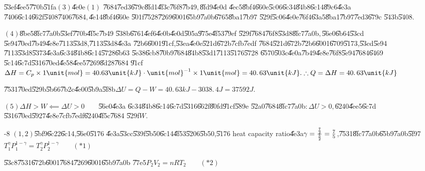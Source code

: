 \documentclass{article}
\begin{document}
\U{53ef}\U{4ee5}\U{770b}\U{51fa}$\left( 3\right) $\U{4e0e}$\left( 1\right) $%
\U{7684}\U{7ed3}\U{679c}\U{8fd1}\U{4f3c}\U{76f8}\U{7b49}$,$\U{8fd9}\U{4e0d}%
\U{4ec5}\U{8bf4}\U{660e}\U{5c06}\U{6c34}\U{84b8}\U{6c14}\U{89c6}\U{4e3a}%
\U{7406}\U{6c14}\U{662f}\U{5408}\U{7406}\U{7684}$,$\U{4e14}\U{8bf4}\U{660e}%
\U{501f}\U{7528}\U{7269}\U{6001}\U{65b9}\U{7a0b}\U{6765}\U{8ba1}\U{7b97}%
\U{529f}\U{5c06}\U{4e0e}\U{76f4}\U{63a5}\U{8ba1}\U{7b97}\U{7ed3}\U{679c}%
\U{543b}\U{5408}$.$

$\left( 4\right) $\U{8be5}\U{8fc7}\U{7a0b}\U{53ef}\U{770b}\U{4f5c}\U{7b49}%
\U{538b}\U{6761}\U{4ef6}\U{4e0b}\U{4e0d}\U{505a}\U{975e}\U{4f53}\U{79ef}%
\U{529f}\U{7684}\U{76f8}\U{53d8}\U{8fc7}\U{7a0b}$,$\U{56e0}\U{6b64}\U{53cd}%
\U{5e94}\U{70ed}\U{7b49}\U{4e8e}\U{7113}\U{53d8},\U{7113}\U{53d8}\U{4e3a}%
\U{72b6}\U{6001}\U{91cf},\U{53ea}\U{4e0e}\U{521d}\U{672b}\U{7cfb}\U{7edf}%
\U{7684}\U{521d}\U{672b}\U{72b6}\U{6001}\U{6709}\U{5173},\U{53cd}\U{5e94}%
\U{7113}\U{53d8}\U{5373}\U{4e3a}\U{6c34}\U{84b8}\U{6c14}\U{5728}\U{6b63}%
\U{5e38}\U{6cb8}\U{70b9}\U{7684}\U{84b8}\U{53d1}\U{7113}\U{5176}\U{5728}%
\U{6570}\U{503c}\U{4e0a}\U{7b49}\U{4e8e}\U{76f8}\U{5e94}\U{7684}\U{6469}%
\U{5c14}\U{6c7d}\U{5316}\U{70ed}\U{4e58}\U{4ee5}\U{7269}\U{8d28}\U{7684}%
\U{91cf}\qquad $\Delta H=C_{p}\times 1\unit{mol}=40.63\unit{kJ}\cdot \unit{%
mol}^{-1}\times 1\unit{mol}=\allowbreak 40.\,\allowbreak 63\unit{kJ}%
.\therefore Q=\Delta H=\allowbreak 40.\,\allowbreak 63\unit{kJ}$

\U{7531}\U{70ed}\U{529b}\U{5b66}\U{7b2c}\U{4e00}\U{5b9a}\U{5f8b}\qquad $%
\Delta U=Q-W=\allowbreak 40.\,\allowbreak 63\unit{kJ}-\allowbreak
3038.\,\allowbreak 4\unit{J}=\allowbreak 37592\unit{J}.$

$\left( 5\right) \Delta H>W\impliedby \Delta U>0\qquad $\U{56e0}\U{4e3a}%
\U{6c34}\U{84b8}\U{6c14}\U{6c7d}\U{5316}\U{662f}\U{80fd}\U{91cf}\U{589e}%
\U{52a0}\U{7684}\U{8fc7}\U{7a0b}$:\Delta U>0,$\U{6240}\U{4ee5}\U{6c7d}%
\U{5316}\U{70ed}\U{5927}\U{4e8e}\U{7cfb}\U{7edf}\U{6240}\U{4f5c}\U{7684}%
\U{529f}$W.$

-8 $\left( 1,2\right) $\U{5bf9}\U{6c22}\U{6c14},\U{56e0}\U{5176}%
\U{4e3a}\U{53cc}\U{539f}\U{5b50}\U{6c14}\U{4f53}\U{5206}\U{5b50},\U{5176}%
heat capacity ratio\U{4e3a}$\gamma =\frac{\frac{7}{2}}{\frac{5}{2}}=\frac{7}{%
5}$,\U{7531}\U{8fc7}\U{7a0b}\U{65b9}\U{7a0b}\U{5f97}$T_{1}^{\gamma
}P_{1}^{1-\gamma }=T_{2}^{\gamma }P_{2}^{1-\gamma }\qquad \left( \ast
1\right) $

\U{53c8}\U{7531}\U{672b}\U{6001}\U{7684}\U{7269}\U{6001}\U{65b9}\U{7a0b}%
\U{77e5}\qquad $P_{2}V_{2}=nRT_{2}\qquad \left( \ast 2\right) $
\end{document}
